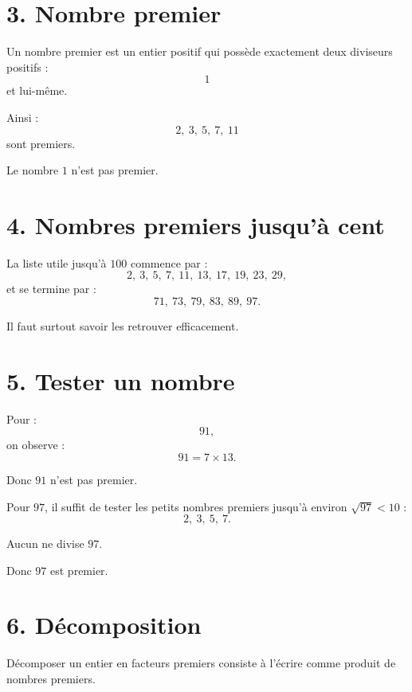 \section{3. Nombre premier}

\begin{definition}
Un nombre premier est un entier positif qui possède exactement deux diviseurs positifs :
\[
1
\]
et lui-même.
\end{definition}

Ainsi :
\[
2,\ 3,\ 5,\ 7,\ 11
\]
sont premiers.

Le nombre $1$ n'est pas premier.

\section{4. Nombres premiers jusqu'à cent}


La liste utile jusqu'à $100$ commence par :
\[
2,\ 3,\ 5,\ 7,\ 11,\ 13,\ 17,\ 19,\ 23,\ 29,
\]
et se termine par :
\[
71,\ 73,\ 79,\ 83,\ 89,\ 97.
\]

Il faut surtout savoir les retrouver efficacement.

\section{5. Tester un nombre}

Pour :
\[
91,
\]
on observe :
\[
91=7\times13.
\]

Donc $91$ n'est pas premier.

Pour $97$, il suffit de tester les petits nombres premiers jusqu'à environ $\sqrt{97}<10$ :
\[
2,\ 3,\ 5,\ 7.
\]

Aucun ne divise $97$.

Donc $97$ est premier.

\section{6. Décomposition}

\begin{definition}
Décomposer un entier en facteurs premiers consiste à l'écrire comme produit de nombres premiers.
\end{definition}

